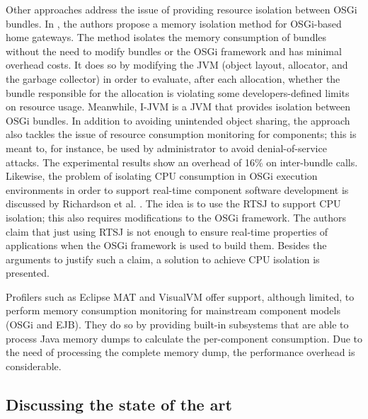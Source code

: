 Other approaches address the issue of providing resource isolation between OSGi bundles.
In \cite{Kuroda2014}, the authors propose a memory isolation method for OSGi-based home gateways.
The method isolates the memory consumption of bundles without the need to modify bundles or the OSGi framework and has minimal overhead costs.
It does so by modifying the JVM (object layout, allocator, and the garbage collector) in order to evaluate, after each allocation, whether the bundle responsible for the allocation is violating some developers-defined limits on resource usage.
Meanwhile, I-JVM \cite{dsn/09/geoffray/ijvm} is a JVM that provides isolation between OSGi bundles.
In addition to avoiding unintended object sharing, the approach also tackles the issue of resource consumption monitoring for components; this is meant to, for instance, be used by administrator to avoid denial-of-service attacks.
The experimental results show an overhead of 16\% on inter-bundle calls.
Likewise, the problem of isolating CPU consumption in OSGi execution environments in order to support real-time component software development is discussed by Richardson et al. \cite{Richardson2009}.
The idea is to use the \gls{RTSJ} to support CPU isolation; this also requires modifications to the OSGi framework.
The authors claim that just using RTSJ is not enough to ensure real-time properties of applications when the OSGi framework is used to build them.
Besides the arguments to justify such a claim, a solution to achieve CPU isolation is presented.

Profilers such as Eclipse MAT and VisualVM offer support, although limited, to perform memory consumption monitoring for mainstream component models (OSGi and EJB).
They do so by providing built-in subsystems that are able to process Java memory dumps to calculate the per-component consumption.
Due to the need of processing the complete memory dump, the performance overhead is considerable. 



%
%
%
%


\subsection{Discussing the state of the art}


